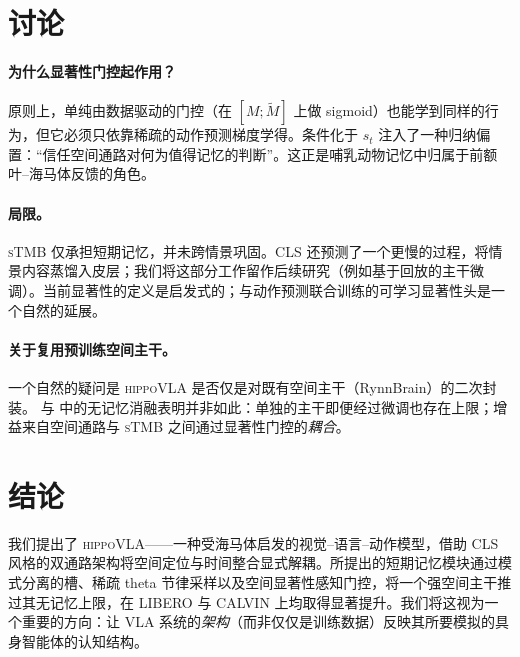 \documentclass[10pt,letterpaper,fontset=fandol]{ctexart}
\newcommand{\method}{\textsc{hippoVLA}\xspace}
\newcommand{\sTMB}{\textsc{sTMB}\xspace}
\begin{document}
\section{讨论}
\label{sec:discussion}

\paragraph{为什么显著性门控起作用？}
原则上，单纯由数据驱动的门控（在 $[M;\tilde M]$ 上做 sigmoid）也能学到同样的行为，但它必须只依靠稀疏的动作预测梯度学得。条件化于 $s_t$ 注入了一种归纳偏置：``信任空间通路对何为值得记忆的判断''。这正是哺乳动物记忆中归属于前额叶--海马体反馈的角色。

\paragraph{局限。}
\sTMB 仅承担短期记忆，并未跨情景巩固。CLS 还预测了一个更慢的过程，将情景内容蒸馏入皮层；我们将这部分工作留作后续研究（例如基于回放的主干微调）。当前显著性的定义是启发式的；与动作预测联合训练的可学习显著性头是一个自然的延展。

\paragraph{关于复用预训练空间主干。}
一个自然的疑问是 \method 是否仅是对既有空间主干（RynnBrain）的二次封装。 与  中的无记忆消融表明并非如此：单独的主干即便经过微调也存在上限；增益来自空间通路与 \sTMB 之间通过显著性门控的\emph{耦合}。

\section{结论}

我们提出了 \method——一种受海马体启发的视觉--语言--动作模型，借助 CLS 风格的双通路架构将空间定位与时间整合显式解耦。所提出的短期记忆模块通过模式分离的槽、稀疏 theta 节律采样以及空间显著性感知门控，将一个强空间主干推过其无记忆上限，在 LIBERO 与 CALVIN 上均取得显著提升。我们将这视为一个重要的方向：让 VLA 系统的\emph{架构}（而非仅仅是训练数据）反映其所要模拟的具身智能体的认知结构。
\end{document}
